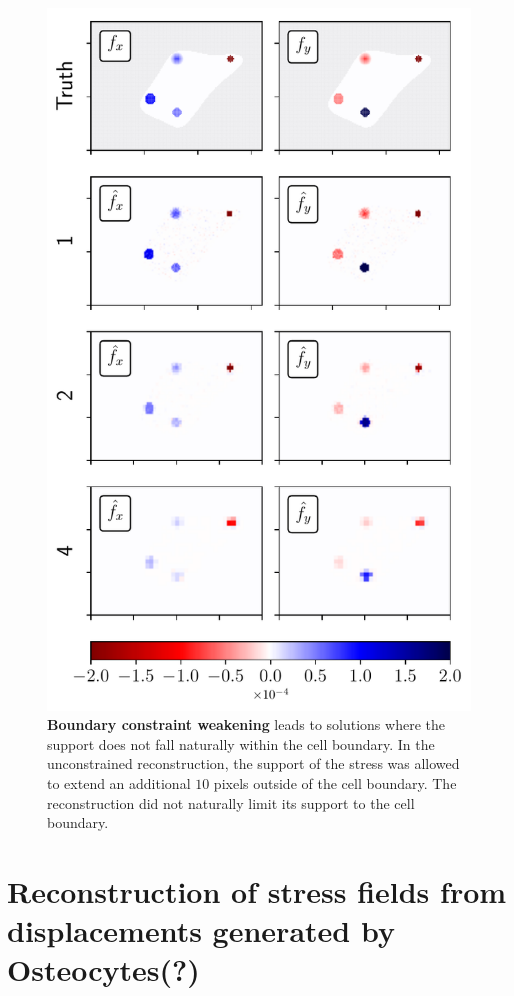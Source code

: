 \documentclass[aps,prl,reprint,twocolumn,groupedaddress,showpacs]{revtex4-1}
\begin{document}
\begin{figure}
\includegraphics[width=\linewidth]{fig4}
\caption{\textbf{Boundary constraint weakening} leads to solutions
  where the support does not fall naturally within the cell
  boundary. In the unconstrained reconstruction, the support of the
  stress was allowed to extend an additional $10$ pixels outside of
  the cell boundary. The reconstruction did not naturally limit its
  support to the cell boundary.}
\label{fig:fig4}
\end{figure}



\section{Reconstruction of stress fields from displacements 
generated by Osteocytes(?)}
\end{document}
